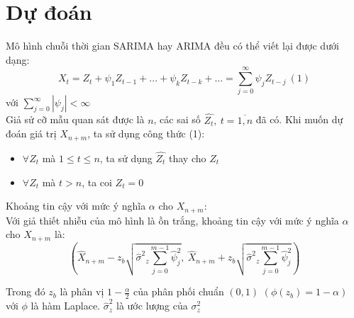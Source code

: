 \documentclass[a4paper, 12pt]{article}
\theoremstyle{plain}
\theoremstyle{definition}
\numberwithin{equation}{section}
\begin{document}
\section{Dự đoán}
	Mô hình chuỗi thời gian SARIMA hay ARIMA đều có thể viết lại được dưới dạng:
	$$X_t = Z_t + \psi_1Z_{t-1} + ... + \psi_kZ_{t-k} + ... = \sum_{j=0}^{\infty}\psi_jZ_{t-j} \ (1) $$
	với $\sum_{j=0}^{\infty}|\psi_j| < \infty$\\
	Giả sử cỡ mẫu quan sát được là $n$, các sai số $\hat{Z_t}, \ t = \overline{1, n}$ đã có. Khi muốn dự đoán giá trị $X_{n+m}$, ta sử dụng công thức (1):
	\begin{itemize}
		\item $\forall Z_t$ mà $1 \leq t \leq n$, ta sử dụng $\hat{Z_t}$ thay cho $Z_t$ 
		\item $\forall Z_t$ mà $t > n$, ta coi $Z_t = 0$
	\end{itemize}
	Khoảng tin cậy với mức ý nghĩa $\alpha$ cho $X_{n+m}$:\\
	Với giả thiết nhiễu của mô hình là ồn trắng, khoảng tin cậy với mức ý nghĩa $\alpha$ cho $X_{n+m}$ là:
	$$ (\hat{X}_{n+m} - z_b\sqrt{{\hat{\sigma}^2}_z\sum_{j=0}^{m-1}\hat{\psi}_j^2}, \ \hat{X}_{n+m} + z_b\sqrt{{\hat{\sigma}^2}_z\sum_{j=0}^{m-1}\hat{\psi}_j^2})$$ 
 	
 	Trong đó $z_b$ là phân vị $1 - \frac{\alpha}{2}$ của phân phối chuẩn $(0, 1)$ $(\phi(z_b) = 1 - \alpha)$ với $\phi$ là hàm Laplace. $\hat{\sigma}_z^2$ là ước lượng của $\sigma_z^2$ 
\end{document}
